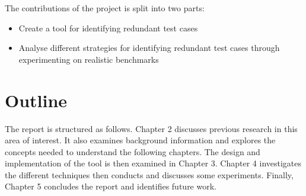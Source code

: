 The contributions of the project is split into two parts: 

\begin{itemize}
\item Create a tool for identifying redundant test cases
\item Analyse different strategies for identifying redundant test cases through experimenting on realistic benchmarks
\end{itemize}

\section{Outline}

The report is structured as follows. Chapter 2 discusses previous research in this area of interest. It also examines background information and explores the concepts needed to understand the following chapters. The design and implementation of the tool is then examined in Chapter 3. Chapter 4 investigates the different techniques then conducts and discusses some experiments. Finally, Chapter 5 concludes the report and identifies future work.